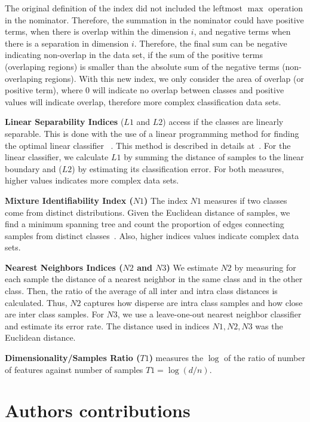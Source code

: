 \documentclass[10pt]{bmc_article}
\newenvironment{bmcformat}{\begin{raggedright}\baselineskip20pt\sloppy\setboolean{publ}{false}}{\end{raggedright}\baselineskip20pt\sloppy}
\begin{document}
\begin{bmcformat}
The original definition of the index did not included the leftmost
$\max$ operation in the nominator. Therefore, the summation in the
nominator could have positive terms, when there is overlap within the
dimension $i$, and negative terms when there is a separation in
dimension $i$. Therefore, the final sum can be negative indicating
non-overlap in the data set, if the sum of the positive terms
(overlaping regions) is smaller than the absolute sum of the
negative terms (non-overlaping regions).  With this new index, we only
consider the area of overlap (or positive term), where $0$ will
indicate no overlap between classes and positive values will indicate
overlap, therefore more complex classification data sets.

{\bf Linear Separability Indices} ($L1$ and $L2$) access if the
classes are linearly separable. This is done with the use of a linear
programming method for finding the optimal linear classifier
~\cite{Smith1968}. This method is described in details
at~\cite{Costa2009b}. For the linear classifier, we calculate $L1$ by
summing the distance of samples to the linear boundary and ($L2$) by
estimating its classification error. For both measures, higher values
indicates more complex data sets.

{\bf Mixture Identifiability Index ($N1$)} The index $N1$ measures if
two classes come from distinct distributions. Given the Euclidean
distance of samples, we find a minimum spanning tree and count
the proportion of edges connecting samples from distinct
classes~\cite{Friedman1979}. Also, higher indices values indicate
complex data sets.

{\bf Nearest Neighbors Indices ($N2$ and $N3$)} We estimate $N2$ by
measuring for each sample the distance of a nearest neighbor in the
same class and in the other class.  Then, the ratio of the average of
all inter and intra class distances is calculated. Thus, $N2$ captures
how disperse are intra class samples and how close are inter class
samples. For $N3$, we use a leave-one-out nearest neighbor classifier
and estimate its error rate. The distance used in indices $N1,N2,N3$
was the Euclidean distance.

{\bf Dimensionality/Samples Ratio ($T1$)} measures the $\log$ of the
ratio of number of features against number of samples $T1=\log(d/n)$.



\section*{Authors contributions}


\end{bmcformat}
\end{document}
